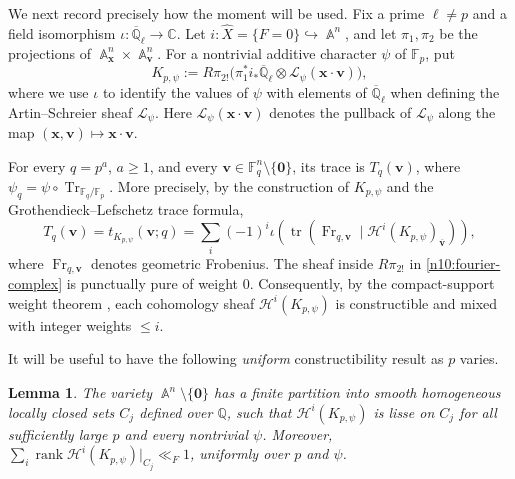 \documentclass[a4paper,11pt, twoside,reqno]{amsart}
\theoremstyle{plain}
\newtheorem{lemma}[thm]{Lemma}
\theoremstyle{definition}
\theoremstyle{remark}
\newcommand{\bfv}{\bm{v}}
\newcommand{\bfx}{\bm{x}}
\newcommand{\QQ}{\mathbb{Q}}
\DeclareMathOperator{\rank}{rank}
\DeclareMathOperator{\Tr}{Tr}
\DeclareMathOperator{\A}{\mathbb{A}}
\renewcommand{\bar}{\overline}
\renewcommand{\leq}{\leqslant}
\renewcommand{\ge}{\geqslant}
\newcommand{\FF}{\mathbb{F}}
\newcommand{\Qbar}{\overline{\mathbb{Q}}}
\newcommand{\CC}{\mathbb{C}}
\newcommand{\cone}{\widehat}
\numberwithin{equation}{section}
\begin{document}
We next record precisely how the moment will be used.
Fix a prime $\ell\ne p$ and a field isomorphism
$\iota:\Qbar_\ell\to \CC$.
Let $i:\cone X=\{F=0\}\hookrightarrow\A^n$, and let
$\pi_1,\pi_2$ be the projections of
$\A^n_{\bfx}\times\A^n_{\bfv}$.
For a nontrivial additive character $\psi$ of $\FF_p$, put
\begin{equation}
K_{p,\psi}:=R\pi_{2!}
\bigl(\pi_1^*i_*\Qbar_\ell
\otimes\mathcal L_\psi(\bfx\cdot\bfv)\bigr),
\label{n10:fourier-complex}
\end{equation}
where we use $\iota$ to identify the values of $\psi$ with elements of $\Qbar_\ell$ when
defining the Artin--Schreier sheaf $\mathcal L_\psi$.
Here $\mathcal L_\psi(\bfx\cdot\bfv)$ denotes the pullback
of $\mathcal L_\psi$ along the map $(\bfx,\bfv)\mapsto\bfx\cdot\bfv$.

For every $q=p^a$, $a\ge1$, and every
$\bfv\in\FF_q^n\setminus\{\bm0\}$, its trace is $T_q(\bfv)$,
where $\psi_q=\psi\circ\Tr_{\FF_q/\FF_p}$.
More precisely, by the construction of $K_{p,\psi}$ and the
Grothendieck--Lefschetz trace formula,
\begin{equation}
 T_q(\bfv)
 =t_{K_{p,\psi}}(\bfv;q)
 =\sum_i(-1)^i\iota\left(
   \operatorname{tr}\left(
     \operatorname{Fr}_{q,\bfv}
     \mid
     \mathcal H^i(K_{p,\psi})_{\bar{\bfv}}
   \right)\right),
   \label{eq : GLT}
\end{equation}
where $\operatorname{Fr}_{q,\bfv}$ denotes geometric Frobenius.
The sheaf inside $R\pi_{2!}$ in
\eqref{n10:fourier-complex} is punctually pure of weight $0$.
Consequently, by the compact-support weight theorem
\cite[Theorem~3.3.1]{Del}, each cohomology sheaf
$\mathcal H^i(K_{p,\psi})$ is constructible and mixed
with integer weights $\leq i$.

It will be useful to have the following \emph{uniform} constructibility result as $p$ varies.

\begin{lemma}\label{n10:ss-adapted}
The variety $\A^n \setminus \{\bm0\}$ has a finite partition into smooth
homogeneous locally closed sets $C_j$ defined over $\QQ$, such that
$\mathcal H^i(K_{p,\psi})$ is lisse on $C_j$
for all sufficiently large $p$
and every nontrivial $\psi$.
Moreover,
$\sum_i \rank \mathcal H^i(K_{p,\psi})\vert_{C_j} \ll_F 1$, uniformly over $p$ and $\psi$.
\end{lemma}
\end{document}
